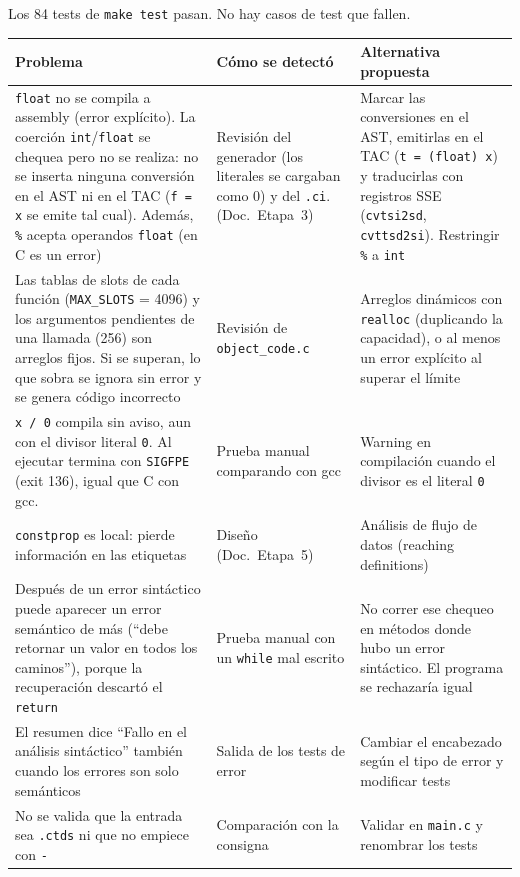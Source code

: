 \documentclass[11pt,a4paper]{article}
\newcommand{\code}[1]{\texttt{#1}}
\newcommand{\doc}[1]{(Doc.\ Etapa~#1)}
\begin{document}
Los 84 tests de \code{make test} pasan. No hay casos de test que fallen.

{\small
\begin{tabularx}{\textwidth}{P{5.6cm}LL}
\toprule
\textbf{Problema} & \textbf{Cómo se detectó} & \textbf{Alternativa propuesta} \\
\midrule
\code{float} no se compila a assembly (error explícito). La coerción \code{int}/\code{float} se chequea pero no se realiza: no se inserta ninguna conversión en el AST ni en el TAC (\code{f = x} se emite tal cual). Además, \code{\%} acepta operandos \code{float} (en C es un error) & Revisión del generador (los literales se cargaban como 0) y del \code{.ci}. \doc{3} & Marcar las conversiones en el AST, emitirlas en el TAC (\code{t = (float) x}) y traducirlas con registros SSE (\code{cvtsi2sd}, \code{cvttsd2si}). Restringir \code{\%} a \code{int} \\
Las tablas de slots de cada función (\code{MAX\_SLOTS} = 4096) y los argumentos pendientes de una llamada (256) son arreglos fijos. Si se superan, lo que sobra se ignora sin error y se genera código incorrecto & Revisión de \code{object\_code.c} & Arreglos dinámicos con \code{realloc} (duplicando la capacidad), o al menos un error explícito al superar el límite \\
\code{x / 0} compila sin aviso, aun con el divisor literal \code{0}. Al ejecutar termina con \code{SIGFPE} (exit 136), igual que C con gcc. & Prueba manual comparando con gcc & Warning en compilación cuando el divisor es el literal \code{0} \\
\code{constprop} es local: pierde información en las etiquetas & Diseño \doc{5} & Análisis de flujo de datos (reaching definitions) \\
Después de un error sintáctico puede aparecer un error semántico de más (``debe retornar un valor en todos los caminos''), porque la recuperación descartó el \code{return} & Prueba manual con un \code{while} mal escrito & No correr ese chequeo en métodos donde hubo un error sintáctico. El programa se rechazaría igual  \\
El resumen dice ``Fallo en el análisis sintáctico'' también cuando los errores son solo semánticos & Salida de los tests de error & Cambiar el encabezado según el tipo de error y modificar tests \\
No se valida que la entrada sea \code{.ctds} ni que no empiece con \code{-} & Comparación con la consigna & Validar en \code{main.c} y renombrar los tests \\

\end{tabularx}}
\end{document}
